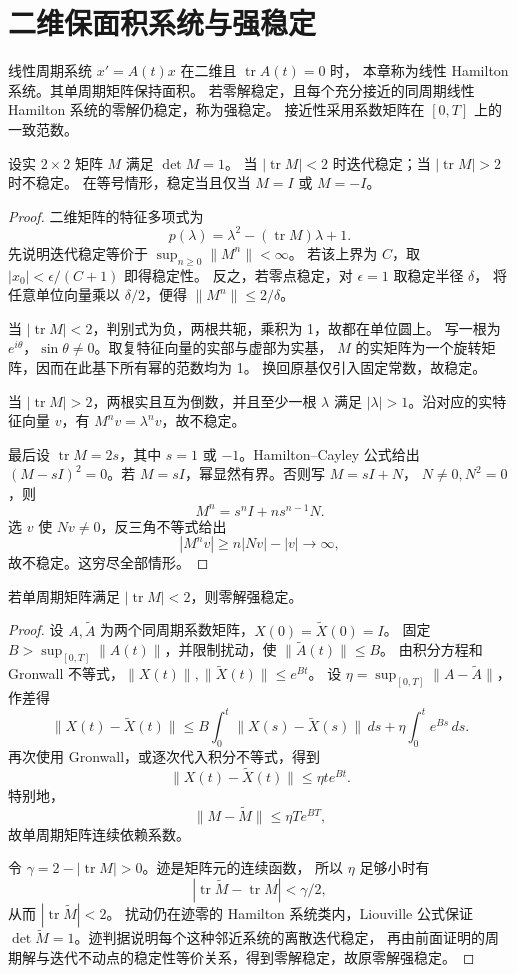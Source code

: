 \section{二维保面积系统与强稳定}
\begin{definition}
线性周期系统 $x'=A(t)x$ 在二维且 $\operatorname{tr}A(t)=0$ 时，
本章称为线性 Hamilton 系统。其单周期矩阵保持面积。
若零解稳定，且每个充分接近的同周期线性 Hamilton 系统的零解仍稳定，称为强稳定。
接近性采用系数矩阵在 $[0,T]$ 上的一致范数。
\end{definition}
\begin{theorem}[迹判据]
设实 $2\times2$ 矩阵 $M$ 满足 $\det M=1$。
当 $|\operatorname{tr}M|<2$ 时迭代稳定；当 $|\operatorname{tr}M|>2$ 时不稳定。
在等号情形，稳定当且仅当 $M=I$ 或 $M=-I$。
\end{theorem}
\begin{proof}
二维矩阵的特征多项式为
\[
 p(\lambda)=\lambda^2-(\operatorname{tr}M)\lambda+1.
\]
先说明迭代稳定等价于 $\sup_{n\geq0}\|M^n\|<\infty$。
若该上界为 $C$，取 $|x_0|<\epsilon/(C+1)$ 即得稳定性。
反之，若零点稳定，对 $\epsilon=1$ 取稳定半径 $\delta$，
将任意单位向量乘以 $\delta/2$，便得 $\|M^n\|\leq2/\delta$。

当 $|\operatorname{tr}M|<2$，判别式为负，两根共轭，乘积为 1，故都在单位圆上。
写一根为 $e^{i\theta}$，$\sin\theta\ne0$。取复特征向量的实部与虚部为实基，
$M$ 的实矩阵为一个旋转矩阵，因而在此基下所有幂的范数均为 1。
换回原基仅引入固定常数，故稳定。

当 $|\operatorname{tr}M|>2$，两根实且互为倒数，并且至少一根 $\lambda$ 满足
$|\lambda|>1$。沿对应的实特征向量 $v$，有 $M^nv=\lambda^nv$，故不稳定。

最后设 $\operatorname{tr}M=2s$，其中 $s=1$ 或 $-1$。Hamilton--Cayley 公式给出
$(M-sI)^2=0$。若 $M=sI$，幂显然有界。否则写 $M=sI+N$，
$N\ne0,N^2=0$，则
\[
 M^n=s^nI+ns^{n-1}N.
\]
选 $v$ 使 $Nv\ne0$，反三角不等式给出
\[
 |M^nv|\geq n|Nv|-|v|\to\infty,
\]
故不稳定。这穷尽全部情形。
\end{proof}
\begin{corollary}
若单周期矩阵满足 $|\operatorname{tr}M|<2$，则零解强稳定。
\end{corollary}
\begin{proof}
设 $A,\widetilde A$ 为两个同周期系数矩阵，$X(0)=\widetilde X(0)=I$。
固定 $B>\sup_{[0,T]}\|A(t)\|$，并限制扰动，使 $\|\widetilde A(t)\|\leq B$。
由积分方程和 Gronwall 不等式，$\|X(t)\|,\|\widetilde X(t)\|\leq e^{Bt}$。
设 $\eta=\sup_{[0,T]}\|A-\widetilde A\|$，作差得
\[
 \|X(t)-\widetilde X(t)\|
 \leq B\int_0^t\|X(s)-\widetilde X(s)\|\,ds
       +\eta\int_0^te^{Bs}\,ds.
\]
再次使用 Gronwall，或逐次代入积分不等式，得到
\[
 \|X(t)-\widetilde X(t)\|\leq\eta t e^{Bt}.
\]
特别地，
\[
 \|M-\widetilde M\|\leq\eta T e^{BT},
\]
故单周期矩阵连续依赖系数。

令 $\gamma=2-|\operatorname{tr}M|>0$。迹是矩阵元的连续函数，
所以 $\eta$ 足够小时有
\[
 |\operatorname{tr}\widetilde M-\operatorname{tr}M|<\gamma/2,
\]
从而
$|\operatorname{tr}\widetilde M|<2$。
扰动仍在迹零的 Hamilton 系统类内，Liouville 公式保证
$\det\widetilde M=1$。迹判据说明每个这种邻近系统的离散迭代稳定，
再由前面证明的周期解与迭代不动点的稳定性等价关系，得到零解稳定，故原零解强稳定。
\end{proof}
